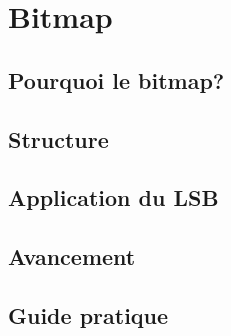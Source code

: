\section {Bitmap}
\subsection {Pourquoi le bitmap?}
\subsection {Structure}
\subsection {Application du LSB}
\subsection {Avancement}
\subsection {Guide pratique}